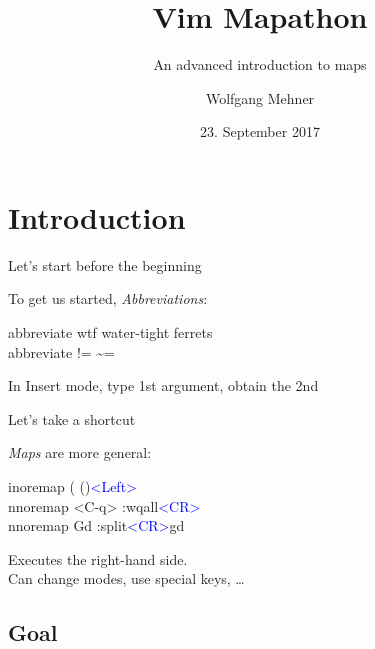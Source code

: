 \documentclass{beamer}
\author[W. Mehner]{Wolfgang Mehner}
\title[Vim Maps]{Vim Mapathon}
\subtitle[Vim Maps]{An advanced introduction to maps}
\institute[]{Vimfest 2017}
\date[23.9.17]{23. September 2017}
\newenvironment{mycode}[0]
{\ttfamily}
{}
\newcommand{\myctrlkey}[1]{\textcolor{blue}{#1}}
\begin{document}

\maketitle


\section*{Introduction}

\begin{frame}{Let's start before the beginning}{}

	To get us started, \textit{Abbreviations}: \\
	\vspace{2mm}

	\begin{mycode}
		abbreviate  wtf   water-tight ferrets \\
		abbreviate  != {} \textasciitilde{}= \\
	\end{mycode}

	\vspace{2mm}

	In Insert mode, type 1st argument, obtain the 2nd
\end{frame}

\begin{frame}{Let's take a shortcut}{}

	\textit{Maps} are more general: \\
	\vspace{2mm}

	\begin{mycode}
		inoremap  (  {} {} {} {} ()\myctrlkey{<Left>} \\[2mm]
		nnoremap  <C-q>       :wqall\myctrlkey{<CR>} \\
		nnoremap  Gd {} {} {} :split\myctrlkey{<CR>}gd
	\end{mycode}

	\vspace{2mm}

	Executes the right-hand side.\\
	Can change modes, use special keys, \dots
\end{frame}

\subsection*{Goal}
\end{document}
